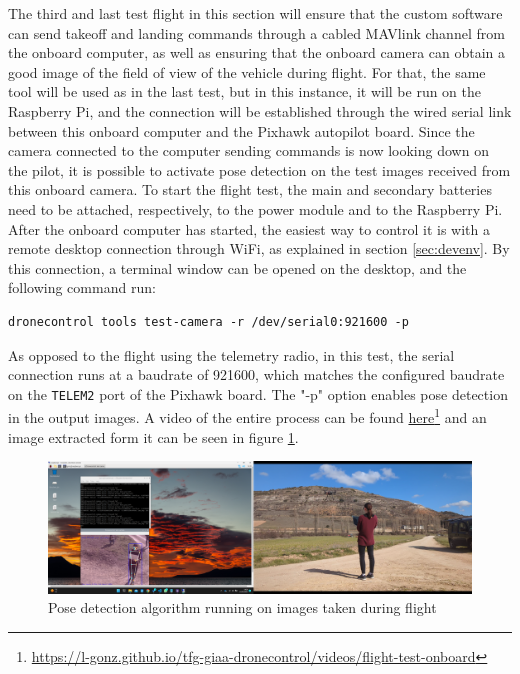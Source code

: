 The third and last test flight in this section will ensure that the custom software can send takeoff and landing commands through a cabled MAVlink channel from the onboard computer,
as well as ensuring that the onboard camera can obtain a good image of the field of view of the vehicle during flight.
For that, the same tool will be used as in the last test, 
but in this instance, it will be run on the Raspberry Pi, and the connection will be established through the wired serial link between this onboard computer and the Pixhawk autopilot board.
Since the camera connected to the computer sending commands is now looking down on the pilot, it is possible to activate pose detection on the test images received from this onboard camera.
To start the flight test, the main and secondary batteries need to be attached, respectively, to the power module and to the Raspberry Pi.
After the onboard computer has started, the easiest way to control it is with a remote desktop connection through WiFi, as explained in section \ref{sec:devenv}.
By this connection, a terminal window can be opened on the desktop, and the following command run:
\begin{verbatim}
dronecontrol tools test-camera -r /dev/serial0:921600 -p
\end{verbatim}
As opposed to the flight using the telemetry radio, in this test, the serial connection runs at a baudrate of 921600, which matches the configured baudrate on the \texttt{TELEM2} port of the Pixhawk board.
The "-p" option enables pose detection in the output images.
A video of the entire process can be found \href{https://l-gonz.github.io/tfg-giaa-dronecontrol/videos/flight-test-onboard}{here}\footnote{\url{https://l-gonz.github.io/tfg-giaa-dronecontrol/videos/flight-test-onboard}} and an image extracted form it can be seen in figure \ref{fig:flight-test-cam-onboard}.


\begin{figure}
  \centering
  \includegraphics[width=\textwidth, keepaspectratio]{img/video-field-test-onboard.png}
  \caption{Pose detection algorithm running on images taken during flight}
  \label{fig:flight-test-cam-onboard}
\end{figure}


